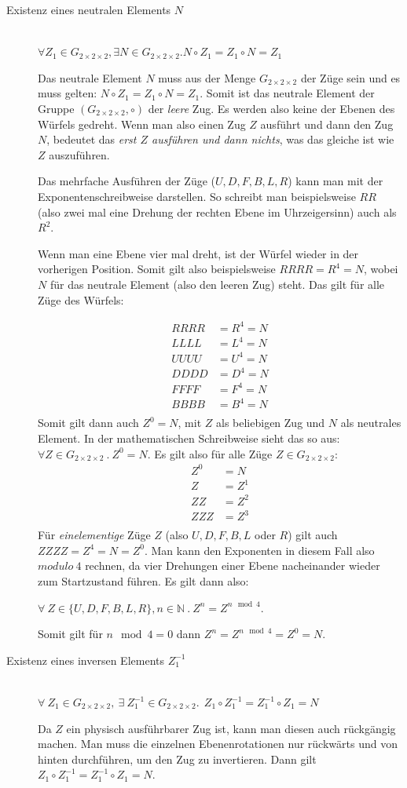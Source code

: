 \documentclass[12pt,a4paper, usenames, dvipsnames]{article}
\theoremstyle{mystyle}
\theoremstyle{definition}
\newcommand{\Gtwo}{\ensuremath{G_{2\times 2\times 2}}}
\begin{document}
\begin{description}
\item [Existenz eines neutralen Elements $N$] \ \\
$\forall Z_1 \in \Gtwo, \exists N \in \Gtwo.N \circ Z_1 = Z_1 \circ N = Z_1$ 


Das neutrale Element $N$ muss aus der Menge $\Gtwo$ der Züge sein und es muss gelten: $N \circ Z_1 = Z_1 \circ N = Z_1$. Somit ist das neutrale Element der Gruppe $(\Gtwo, \circ)$ der \textit{leere} Zug. Es werden also keine der Ebenen des Würfels gedreht. Wenn man also einen Zug $Z$ ausführt und dann den Zug $N$, bedeutet das \textit{erst $Z$ ausführen und dann nichts}, was das gleiche ist wie $Z$ auszuführen.

Das mehrfache Ausführen der Züge ($U, D, F, B, L, R$) kann man mit der Exponentenschreibweise darstellen. So schreibt man beispielsweise $RR$ (also zwei mal eine Drehung der rechten Ebene im Uhrzeigersinn) auch als $R^2$.

Wenn man eine Ebene vier mal dreht, ist der Würfel wieder in der vorherigen Position. Somit gilt also beispielsweise $RRRR=R^4=N$, wobei $N$ für das neutrale Element (also den leeren Zug) steht. Das gilt für alle Züge des Würfels:

\begin{align*}
RRRR & =R^4 =N \\
LLLL & =L^4 =N \\
UUUU & =U^4 =N \\
DDDD & =D^4 =N \\
FFFF & =F^4 =N \\
BBBB & =B^4 =N \\
\end{align*}
Somit gilt dann auch $Z^0=N$, mit $Z$ als beliebigen Zug und $N$ als neutrales Element. 
In der mathematischen Schreibweise sieht das so aus: $\forall Z \in \Gtwo \ . \ Z^0=N$. 
Es gilt also für alle Züge $Z \in \Gtwo$: 
\begin{align*}
Z^0 & =N \\
Z & =Z^1 \\
ZZ & =Z^2 \\
ZZZ & =Z^3 \\
\end{align*}
Für \textit{einelementige} Züge $Z$ (also $U, D, F, B, L$ oder $R$) gilt auch $ZZZZ =Z^4=N=Z^0$.
Man kann den Exponenten in diesem Fall also $modulo \ 4$ rechnen, da vier Drehungen einer Ebene nacheinander wieder zum Startzustand führen. 
Es gilt dann also:

$\forall \  Z \in \{U, D, F, B, L, R\}, n \in \mathbb{N} \ . \ Z^n=Z^{n \mod 4}$.

Somit gilt für $n \mod 4 = 0$ dann $Z^n = Z^{n \mod 4} = Z^0 = N$.


\item [Existenz eines inversen Elements $Z_1^{-1}$] \ \\
$\forall \  Z_1 \in \Gtwo,\ \exists \  Z_1^{-1} \in \Gtwo.  \ \ Z_1 \circ Z_1^{-1} = Z_1^{-1} \circ Z_1 = N$  


Da $Z$ ein physisch ausführbarer Zug ist, kann man diesen auch rückgängig machen. Man muss die einzelnen Ebenenrotationen nur rückwärts und von hinten durchführen, um den Zug zu invertieren. Dann gilt $Z_1 \circ Z_1^{-1} = Z_1^{-1} \circ Z_1 = N$.
\end{description}
\end{document}
